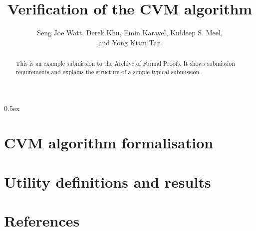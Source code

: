 \documentclass[11pt, a4paper]{report}
\begin{document}
\title{Verification of the CVM algorithm}

\author{
  Seng Joe Watt,
  Derek Khu,
  Emin Karayel,
  Kuldeep S. Meel,
  \\
  and Yong Kiam Tan}

\maketitle

\begin{abstract}
  This is an example submission to the Archive of Formal Proofs. It
  shows submission requirements and explains the structure of a simple
  typical submission.
\end{abstract}

\tableofcontents

\parindent 0pt
\parskip 0.5ex

\chapter{CVM algorithm formalisation}










\chapter{Utility definitions and results}












\chapter{References}



\end{document}
